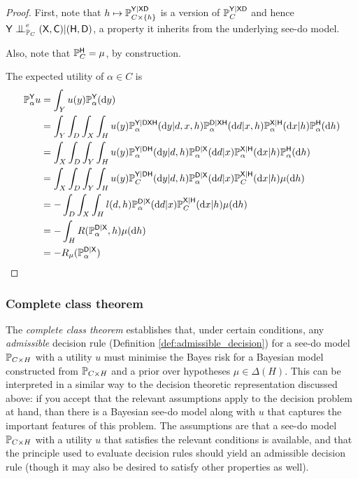 \begin{proof}
First, note that $h\mapsto \mathbb{P}_{C\times \{h\}}^{\mathsf{Y}|\mathsf{XD}}$ is a version of $\mathbb{P}_C^{\mathsf{Y}|\mathsf{XD}}$ and hence $\RV{Y}\CI^e_{\prob{P}_C} (\RV{X},\RV{C})|(\RV{H},\RV{D})$, a property it inherits from the underlying see-do model.

Also, note that $\mathbb{P}_C^{\mathsf{H}}=\mu$, by construction.

The expected utility of $\alpha\in C$ is 
\begin{align}
    \mathbb{P}_\alpha^{\mathsf{Y}} u &= \int_Y u(y) \mathbb{P}_{\alpha}^{\mathsf{Y}}(\mathrm{d}y) \\
    &= \int_Y  \int_D \int_{X} \int_H u(y)\mathbb{P}_{\alpha}^{\mathsf{Y}|\mathsf{DXH}}(\mathrm{d}y|d,x,h)\mathbb{P}_{\alpha}^{\mathsf{D}|\mathsf{XH}}(\mathrm{d}d|x,h)\mathbb{P}_{\alpha}^{\mathsf{X}|\mathsf{H}}(\mathrm{d}x|h)\mathbb{P}_\alpha^{\mathsf{H}}(\mathrm{d}h) \\
    &= \int_X  \int_D \int_{Y} \int_H u(y) \mathbb{P}_{\alpha}^{\mathsf{Y}|\mathsf{DH}}(\mathrm{d}y|d,h)\mathbb{P}_{\alpha}^{\mathsf{D}|\mathsf{X}}(\mathrm{d}d|x)\mathbb{P}_{\alpha}^{\mathsf{X}|\mathsf{H}}(\mathrm{d}x|h)\mathbb{P}_\alpha^{\mathsf{H}}(\mathrm{d}h)\label{eq:because_of_ci}\\
    &=  \int_X  \int_D \int_{Y} \int_H u(y) \mathbb{P}_{C}^{\mathsf{Y}|\mathsf{DH}}(\mathrm{d}y|d,h)\mathbb{P}_{\alpha}^{\mathsf{D}|\mathsf{X}}(\mathrm{d}d|x)\mathbb{P}_{C}^{\mathsf{X}|\mathsf{H}}(\mathrm{d}x|h)\mu(\mathrm{d}h)\\
     &= -\int_D\int_X\int_H l(d,h)\mathbb{P}_{\alpha}^{\mathsf{D}|\mathsf{X}}(\mathrm{d}d|x)\mathbb{P}_{C}^{\mathsf{X}|\mathsf{H}}(\mathrm{d}x|h)\mu(\mathrm{d}h)\\
    &= -\int_H R(\mathbb{P}_{\alpha}^{\mathsf{D}|\mathsf{X}},h)\mu(\mathrm{d}h)\\
    &= -R_{\mu}(\mathbb{P}_{\alpha}^{\mathsf{D}|\mathsf{X}})
\end{align}
\end{proof}

\subsubsection{Complete class theorem}\label{sec:cc_theorem}

The \emph{complete class theorem} establishes that, under certain conditions, any \emph{admissible} decision rule (Definition \ref{def:admissible_decision}) for a see-do model $\mathbb{P}_{C\times H}$ with a utility $u$ must minimise the Bayes risk for a Bayesian model constructed from $\mathbb{P}_{C\times H}$ and a prior over hypotheses $\mu\in \Delta(H)$. This can be interpreted in a similar way to the decision theoretic representation discussed above: if you accept that the relevant assumptions apply to the decision problem at hand, than there is a Bayesian see-do model along with $u$ that captures the important features of this problem. The assumptions are that a see-do model $\mathbb{P}_{C\times H}$ with a utility $u$ that satisfies the relevant conditions is available, and that the principle used to evaluate decision rules should yield an admissible decision rule (though it may also be desired to satisfy other properties as well).

